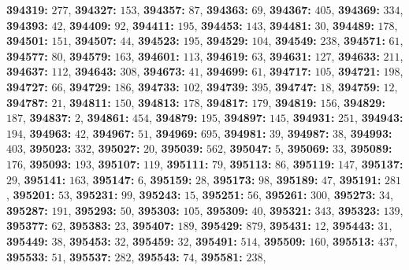 \textsf{\bfseries 394319:} $277$, \textsf{\bfseries 394327:} $153$, \textsf{\bfseries 394357:} $87$, \textsf{\bfseries 394363:} $69$, \textsf{\bfseries 394367:} $405$, \textsf{\bfseries 394369:} $334$, \textsf{\bfseries 394393:} $42$, \textsf{\bfseries 394409:} $92$, \textsf{\bfseries 394411:} $195$, \textsf{\bfseries 394453:} $143$, \textsf{\bfseries 394481:} $30$, \textsf{\bfseries 394489:} $178$, \textsf{\bfseries 394501:} $151$, \textsf{\bfseries 394507:} $44$, \textsf{\bfseries 394523:} $195$, \textsf{\bfseries 394529:} $104$, \textsf{\bfseries 394549:} $238$, \textsf{\bfseries 394571:} $61$, \textsf{\bfseries 394577:} $80$, \textsf{\bfseries 394579:} $163$, \textsf{\bfseries 394601:} $113$, \textsf{\bfseries 394619:} $63$, \textsf{\bfseries 394631:} $127$, \textsf{\bfseries 394633:} $211$, \textsf{\bfseries 394637:} $112$, \textsf{\bfseries 394643:} $308$, \textsf{\bfseries 394673:} $41$, \textsf{\bfseries 394699:} $61$, \textsf{\bfseries 394717:} $105$, \textsf{\bfseries 394721:} $198$, \textsf{\bfseries 394727:} $66$, \textsf{\bfseries 394729:} $186$, \textsf{\bfseries 394733:} $102$, \textsf{\bfseries 394739:} $395$, \textsf{\bfseries 394747:} $18$, \textsf{\bfseries 394759:} $12$, \textsf{\bfseries 394787:} $21$, \textsf{\bfseries 394811:} $150$, \textsf{\bfseries 394813:} $178$, \textsf{\bfseries 394817:} $179$, \textsf{\bfseries 394819:} $156$, \textsf{\bfseries 394829:} $187$, \textsf{\bfseries 394837:} $2$, \textsf{\bfseries 394861:} $454$, \textsf{\bfseries 394879:} $195$, \textsf{\bfseries 394897:} $145$, \textsf{\bfseries 394931:} $251$, \textsf{\bfseries 394943:} $194$, \textsf{\bfseries 394963:} $42$, \textsf{\bfseries 394967:} $51$, \textsf{\bfseries 394969:} $695$, \textsf{\bfseries 394981:} $39$, \textsf{\bfseries 394987:} $38$, \textsf{\bfseries 394993:} $403$, \textsf{\bfseries 395023:} $332$, \textsf{\bfseries 395027:} $20$, \textsf{\bfseries 395039:} $562$, \textsf{\bfseries 395047:} $5$, \textsf{\bfseries 395069:} $33$, \textsf{\bfseries 395089:} $176$, \textsf{\bfseries 395093:} $193$, \textsf{\bfseries 395107:} $119$, \textsf{\bfseries 395111:} $79$, \textsf{\bfseries 395113:} $86$, \textsf{\bfseries 395119:} $147$, \textsf{\bfseries 395137:} $29$, \textsf{\bfseries 395141:} $163$, \textsf{\bfseries 395147:} $6$, \textsf{\bfseries 395159:} $28$, \textsf{\bfseries 395173:} $98$, \textsf{\bfseries 395189:} $47$, \textsf{\bfseries 395191:} $281$, \textsf{\bfseries 395201:} $53$, \textsf{\bfseries 395231:} $99$, \textsf{\bfseries 395243:} $15$, \textsf{\bfseries 395251:} $56$, \textsf{\bfseries 395261:} $300$, \textsf{\bfseries 395273:} $34$, \textsf{\bfseries 395287:} $191$, \textsf{\bfseries 395293:} $50$, \textsf{\bfseries 395303:} $105$, \textsf{\bfseries 395309:} $40$, \textsf{\bfseries 395321:} $343$, \textsf{\bfseries 395323:} $139$, \textsf{\bfseries 395377:} $62$, \textsf{\bfseries 395383:} $23$, \textsf{\bfseries 395407:} $189$, \textsf{\bfseries 395429:} $879$, \textsf{\bfseries 395431:} $12$, \textsf{\bfseries 395443:} $31$, \textsf{\bfseries 395449:} $38$, \textsf{\bfseries 395453:} $32$, \textsf{\bfseries 395459:} $32$, \textsf{\bfseries 395491:} $514$, \textsf{\bfseries 395509:} $160$, \textsf{\bfseries 395513:} $437$, \textsf{\bfseries 395533:} $51$, \textsf{\bfseries 395537:} $282$, \textsf{\bfseries 395543:} $74$, \textsf{\bfseries 395581:} $238$, 
